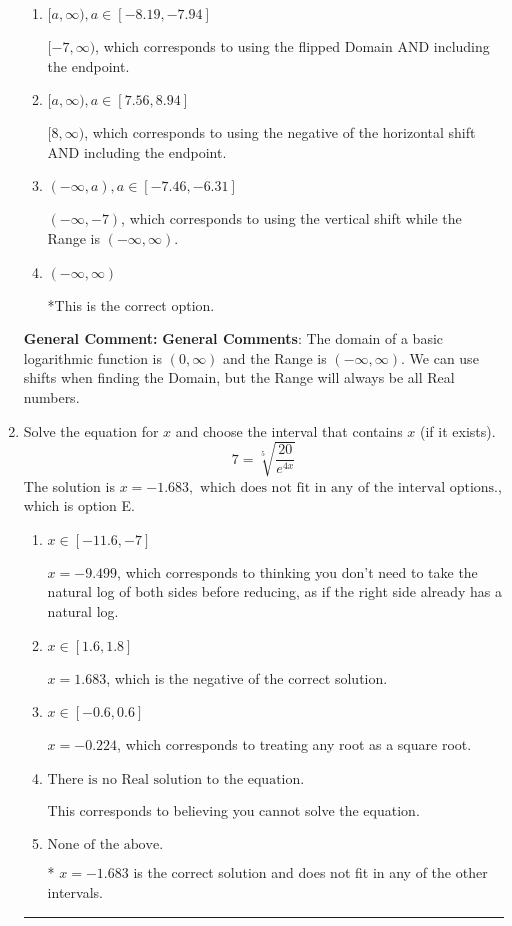 \documentclass{extbook}[14pt]
\newcommand{\litem}[1]{\item #1

\rule{\textwidth}{0.4pt}}
\begin{document}
\begin{enumerate}
{\begin{enumerate}[label=\Alph*.]
$(-\infty, 7)$, which corresponds to using the using the negative of vertical shift on $(0, \infty)$.
\item \( [a, \infty), a \in [-8.19, -7.94] \)

$[-7, \infty)$, which corresponds to using the flipped Domain AND including the endpoint.
\item \( [a, \infty), a \in [7.56, 8.94] \)

$[8, \infty)$, which corresponds to using the negative of the horizontal shift AND including the endpoint.
\item \( (-\infty, a), a \in [-7.46, -6.31] \)

$(-\infty, -7)$, which corresponds to using the vertical shift while the Range is $(-\infty, \infty)$.
\item \( (-\infty, \infty) \)

*This is the correct option.
\end{enumerate}

\textbf{General Comment:} \textbf{General Comments}: The domain of a basic logarithmic function is $(0, \infty)$ and the Range is $(-\infty, \infty)$. We can use shifts when finding the Domain, but the Range will always be all Real numbers.
}
\litem{
 Solve the equation for $x$ and choose the interval that contains $x$ (if it exists).
\[  7 = \sqrt[5]{\frac{20}{e^{4x}}} \]The solution is \( x = -1.683, \text{ which does not fit in any of the interval options.} \), which is option E.\begin{enumerate}[label=\Alph*.]
\item \( x \in [-11.6, -7] \)

$x = -9.499$, which corresponds to thinking you don't need to take the natural log of both sides before reducing, as if the right side already has a natural log.
\item \( x \in [1.6, 1.8] \)

$x = 1.683$, which is the negative of the correct solution.
\item \( x \in [-0.6, 0.6] \)

$x = -0.224$, which corresponds to treating any root as a square root.
\item \( \text{There is no Real solution to the equation.} \)

This corresponds to believing you cannot solve the equation.
\item \( \text{None of the above.} \)

* $x = -1.683$ is the correct solution and does not fit in any of the other intervals.
\end{enumerate}

}
\end{enumerate}
\end{document}
